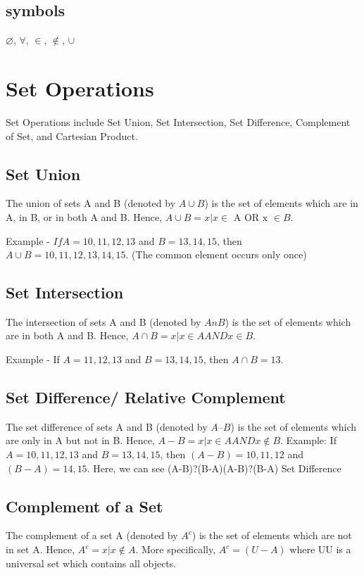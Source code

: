 \documentclass[11pt,a4paper,titlepage,oneside,openany]{article}
\numberwithin{equation}{section}
\numberwithin{algorithm}{section}
\numberwithin{figure}{section}
\numberwithin{table}{section}
\begin{document}
\subsection*{symbols}
$\varnothing$,
$\forall$,
$\in$,
$\notin$,
$\cup$
\newpage

\section{Set Operations}
Set Operations include Set Union, Set Intersection, Set Difference, Complement of Set, and Cartesian Product.

\subsection{Set Union}
The union of sets A and B (denoted by $A \cup B$) is the set of elements which are in A, in B, or in both A and B. Hence, $A \cup B={x|x \in \mbox{ A OR x } \in B}$.

Example - $If A={10,11,12,13}$ and $B = {13,14,15}$, then $A \cup B={10,11,12,13,14,15}$. (The common element occurs only once)

\subsection{Set Intersection}
The intersection of sets A and B (denoted by $AnB$) is the set of elements which are in both A and B. Hence, $A \cap B={x|x \in A AND x \in B}$.

Example - If $A={11,12,13}$ and $B={13,14,15}$, then $A \cap B={13}$.
\subsection{Set Difference/ Relative Complement}
The set difference of sets A and B (denoted by $A–B$) is the set of elements which are only in A but not in B. Hence, $A-B={x|x \in A AND x \notin B}$.
Example: If $A={10,11,12,13}$ and $B={13,14,15}$, then $(A-B)={10,11,12}$ and $(B-A)={14,15}$. Here, we can see (A-B)?(B-A)(A-B)?(B-A) Set Difference
\subsection{Complement of a Set}
The complement of a set A (denoted by $A^{c}$) is the set of elements which are not in set A. Hence, $A^{c}={x|x \notin A}$.
More specifically, $A^{c}=(U-A)$ where UU is a universal set which contains all objects.
\end{document}
